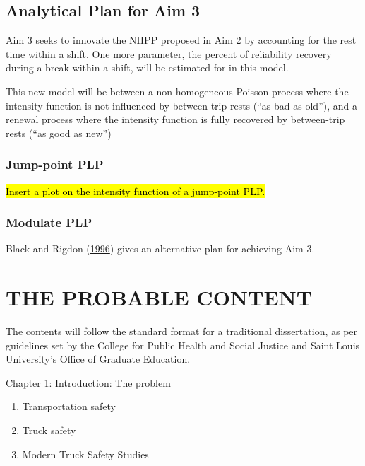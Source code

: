 \documentclass[12pt]{book}
\numberwithin{equation}{chapter}
\providecommand{\tightlist}{%
  \setlength{\itemsep}{0pt}\setlength{\parskip}{0pt}}
\begin{document}
\hypertarget{analytical-plan-for-aim-3}{%
\section{Analytical Plan for Aim 3}\label{analytical-plan-for-aim-3}}

Aim 3 seeks to innovate the NHPP proposed in Aim 2 by accounting for the rest time within a shift. One more parameter, the percent of reliability recovery during a break within a shift, will be estimated for in this model.

This new model will be between a non-homogeneous Poisson process where the intensity function is not influenced by between-trip rests (``as bad as old''), and a renewal process where the intensity function is fully recovered by between-trip rests (``as good as new'')

\hypertarget{jump-point-plp}{%
\subsection{Jump-point PLP}\label{jump-point-plp}}

\hl{Insert a plot on the intensity function of a jump-point PLP.}

\hypertarget{modulate-plp}{%
\subsection{Modulate PLP}\label{modulate-plp}}

Black and Rigdon (\protect\hyperlink{ref-black1996statistical}{1996}) gives an alternative plan for achieving Aim 3.

\hypertarget{the-probable-content}{%
\chapter{THE PROBABLE CONTENT}\label{the-probable-content}}

The contents will follow the standard format for a traditional dissertation, as per guidelines set by the College for Public Health and Social Justice and Saint Louis University's Office of Graduate Education.

Chapter 1: Introduction: The problem

\begin{enumerate}
\def\labelenumi{\arabic{enumi}.}
\tightlist
\item
  Transportation safety
\item
  Truck safety
\item
  Modern Truck Safety Studies
\end{enumerate}
\end{document}
